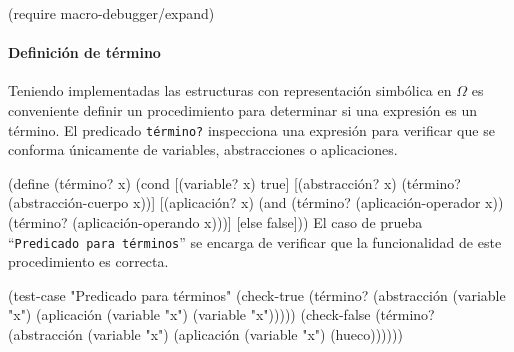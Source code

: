\documentclass[10pt,oneside,openany,letterpaper]{book}
\begin{document}
\nwenddocs{}\plusendmoddef
(require macro-debugger/expand)
\nwendcode{}\nwdocspar

\paragraph{Definición de término} Teniendo implementadas las estructuras con representación simbólica en \( Ω \) es conveniente definir un procedimiento para determinar si una expresión es un término. El predicado {\tt{}\protect{}término?} inspecciona una expresión para verificar que se conforma únicamente de variables, abstracciones o aplicaciones.

\nwenddocs{}\endmoddef
(define (término? x)
  (cond [(variable? x)    true]
        [(abstracción? x) (término? (abstracción-cuerpo x))]
        [(aplicación? x)  (and (término? (aplicación-operador x))
                               (término? (aplicación-operando x)))]
        [else             false]))
\eatline
{}\nwendcode{}\nwdocspar
El caso de prueba ``{\tt{}Predicado\ para\ términos}'' se encarga de verificar que la funcionalidad de este procedimiento es correcta.

\nwenddocs{}\plusendmoddef
(test-case "Predicado para términos"
  (check-true
   (término? (abstracción (variable "x")
                          (aplicación (variable "x") (variable "x")))))
  (check-false
   (término? (abstracción (variable "x") (aplicación (variable "x") (hueco))))))
\nwendcode{}\nwdocspar
\end{document}

